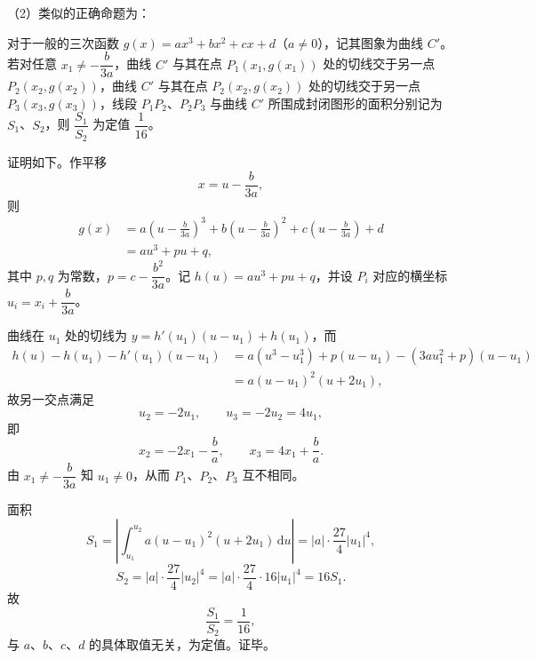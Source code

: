 \begin{answer}
（2）类似的正确命题为：

\begin{gktip}
对于一般的三次函数 $g(x)=ax^3+bx^2+cx+d$（$a\neq0$），记其图象为曲线 $C'$。若对任意 $x_1\neq-\dfrac{b}{3a}$，曲线 $C'$ 与其在点 $P_1(x_1,g(x_1))$ 处的切线交于另一点 $P_2(x_2,g(x_2))$，曲线 $C'$ 与其在点 $P_2(x_2,g(x_2))$ 处的切线交于另一点 $P_3(x_3,g(x_3))$，线段 $P_1P_2$、$P_2P_3$ 与曲线 $C'$ 所围成封闭图形的面积分别记为 $S_1$、$S_2$，则 $\dfrac{S_1}{S_2}$ 为定值 $\dfrac1{16}$。
\end{gktip}

证明如下。作平移
\nopagebreak[4]
\[x=u-\frac{b}{3a},\]
则
\nopagebreak[4]
\[\begin{aligned}
g(x)&=a\left(u-\frac{b}{3a}\right)^3+b\left(u-\frac{b}{3a}\right)^2+c\left(u-\frac{b}{3a}\right)+d\\
&=au^3+pu+q,
\end{aligned}\]
其中 $p,q$ 为常数，$p=c-\dfrac{b^2}{3a}$。记 $h(u)=au^3+pu+q$，并设 $P_i$ 对应的横坐标 $u_i=x_i+\dfrac{b}{3a}$。

曲线在 $u_1$ 处的切线为 $y=h'(u_1)(u-u_1)+h(u_1)$，而
\nopagebreak[4]
\[\begin{aligned}
h(u)-h(u_1)-h'(u_1)(u-u_1)
&=a\left(u^3-u_1^3\right)+p(u-u_1)-\left(3au_1^2+p\right)(u-u_1)\\
&=a(u-u_1)^2(u+2u_1),
\end{aligned}\]
故另一交点满足
\nopagebreak[4]
\[u_2=-2u_1,\qquad u_3=-2u_2=4u_1,\]
即
\nopagebreak[4]
\[x_2=-2x_1-\frac{b}{a},\qquad x_3=4x_1+\frac{b}{a}.\]
由 $x_1\neq-\dfrac{b}{3a}$ 知 $u_1\neq0$，从而 $P_1$、$P_2$、$P_3$ 互不相同。

面积
\nopagebreak[4]
\[S_1=\left|\int_{u_1}^{u_2}a(u-u_1)^2(u+2u_1)\,\mathrm du\right|
=|a|\cdot\frac{27}{4}|u_1|^4,\]
\nopagebreak[4]
\[S_2=|a|\cdot\frac{27}{4}|u_2|^4=|a|\cdot\frac{27}{4}\cdot16|u_1|^4=16S_1.\]
故
\nopagebreak[4]
\[\frac{S_1}{S_2}=\frac1{16},\]
与 $a$、$b$、$c$、$d$ 的具体取值无关，为定值。证毕。


\end{answer}
